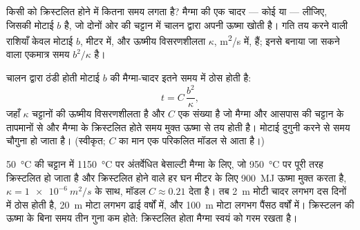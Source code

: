 किसी  को क्रिस्टलित होने में कितना समय लगता है? मैग्मा की एक चादर
--- कोई  या  --- लीजिए, जिसकी मोटाई $b$ है, जो दोनों ओर की चट्टान में
चालन द्वारा अपनी ऊष्मा खोती है। गति तय करने वाली राशियाँ केवल
मोटाई $b$, मीटर में, और ऊष्मीय विसरणशीलता $\kappa$,
\unit{m^2/s} में, हैं; इनसे बनाया जा सकने वाला एकमात्र समय $b^2/\kappa$ है।

\begin{proposition}[मैग्मा की चादर का शीतलन-काल]\label{prop:g11:igneous-rocks:cooling}
चालन द्वारा ठंडी होती मोटाई $b$ की मैग्मा-चादर
इतने समय में ठोस होती है:
\[
  t = C\,\frac{b^2}{\kappa},
\]
जहाँ $\kappa$ चट्टानों की ऊष्मीय विसरणशीलता है और $C$ एक संख्या है जो
मैग्मा और आसपास की चट्टान के तापमानों से और मैग्मा के क्रिस्टलित होते समय
मुक्त ऊष्मा से तय होती है। मोटाई दुगुनी करने से
समय चौगुना हो जाता है। (स्वीकृत; $C$ का मान एक परिकलित मॉडल से आता है।)
\end{proposition}

\qty{50}{\degreeCelsius} की चट्टान में \qty{1150}{\degreeCelsius} पर
अंतर्वेधित बेसाल्टी मैग्मा के लिए, जो
\qty{950}{\degreeCelsius} पर पूरी तरह क्रिस्टलित हो जाता है और क्रिस्टलित होने वाले हर घन
मीटर के लिए \qty{900}{MJ} ऊष्मा मुक्त करता है, $\kappa = \qty{1e-6}{m^2/s}$ के साथ, मॉडल
$C \approx 0.21$ देता है। तब \qty{2}{m} मोटी चादर लगभग दस
दिनों में ठोस होती है, \qty{20}{m} मोटा  लगभग ढाई वर्षों में, और
\qty{100}{m} मोटा लगभग पैंसठ वर्षों में। क्रिस्टलन की ऊष्मा के बिना
समय तीन गुना कम होते: क्रिस्टलित होता
मैग्मा स्वयं को गरम रखता है।

